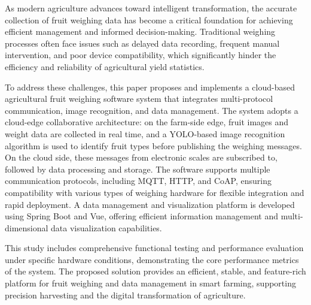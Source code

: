 As modern agriculture advances toward intelligent transformation, the accurate collection of fruit weighing data has become a critical foundation for achieving efficient management and informed decision-making. Traditional weighing processes often face issues such as delayed data recording, frequent manual intervention, and poor device compatibility, which significantly hinder the efficiency and reliability of agricultural yield statistics.

To address these challenges, this paper proposes and implements a cloud-based agricultural fruit weighing software system that integrates multi-protocol communication, image recognition, and data management. The system adopts a cloud-edge collaborative architecture: on the farm-side edge, fruit images and weight data are collected in real time, and a YOLO-based image recognition algorithm is used to identify fruit types before publishing the weighing messages. On the cloud side, these messages from electronic scales are subscribed to, followed by data processing and storage. The software supports multiple communication protocols, including MQTT, HTTP, and CoAP, ensuring compatibility with various types of weighing hardware for flexible integration and rapid deployment. A data management and visualization platform is developed using Spring Boot and Vue, offering efficient information management and multi-dimensional data visualization capabilities.

This study includes comprehensive functional testing and performance evaluation under specific hardware conditions, demonstrating the core performance metrics of the system. The proposed solution provides an efficient, stable, and feature-rich platform for fruit weighing and data management in smart farming, supporting precision harvesting and the digital transformation of agriculture.